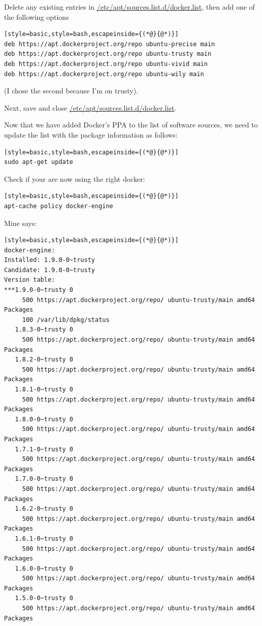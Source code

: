 \documentclass[12pt, a4paper, twoside,openany,titlepage]{article}
\begin{document}
{
Delete any existing entries in \url{/etc/apt/sources.list.d/docker.list}, then add one of the following options
\begin{lstlisting}[style=basic,style=bash,escapeinside={(*@}{@*)}]
deb https://apt.dockerproject.org/repo ubuntu-precise main
deb https://apt.dockerproject.org/repo ubuntu-trusty main
deb https://apt.dockerproject.org/repo ubuntu-vivid main
deb https://apt.dockerproject.org/repo ubuntu-wily main
\end{lstlisting}
(I chose the second because I'm on trusty).

Next, save and close \url{/etc/apt/sources.list.d/docker.list}.

Now that we have added Docker's PPA to the list of software sources, we need to update the list with the package information as follows:
\begin{lstlisting}[style=basic,style=bash,escapeinside={(*@}{@*)}]
sudo apt-get update
\end{lstlisting}

Check if your are now using the right docker:
\begin{lstlisting}[style=basic,style=bash,escapeinside={(*@}{@*)}]
apt-cache policy docker-engine
\end{lstlisting}
Mine says:
\begin{lstlisting}[style=basic,style=bash,escapeinside={(*@}{@*)}]
docker-engine:
Installed: 1.9.0-0~trusty
Candidate: 1.9.0-0~trusty
Version table:
***1.9.0-0~trusty 0
     500 https://apt.dockerproject.org/repo/ ubuntu-trusty/main amd64 Packages
     100 /var/lib/dpkg/status
   1.8.3-0~trusty 0
     500 https://apt.dockerproject.org/repo/ ubuntu-trusty/main amd64 Packages
   1.8.2-0~trusty 0
     500 https://apt.dockerproject.org/repo/ ubuntu-trusty/main amd64 Packages
   1.8.1-0~trusty 0
     500 https://apt.dockerproject.org/repo/ ubuntu-trusty/main amd64 Packages
   1.8.0-0~trusty 0
     500 https://apt.dockerproject.org/repo/ ubuntu-trusty/main amd64 Packages
   1.7.1-0~trusty 0
     500 https://apt.dockerproject.org/repo/ ubuntu-trusty/main amd64 Packages
   1.7.0-0~trusty 0
     500 https://apt.dockerproject.org/repo/ ubuntu-trusty/main amd64 Packages
   1.6.2-0~trusty 0
     500 https://apt.dockerproject.org/repo/ ubuntu-trusty/main amd64 Packages
   1.6.1-0~trusty 0
     500 https://apt.dockerproject.org/repo/ ubuntu-trusty/main amd64 Packages
   1.6.0-0~trusty 0
     500 https://apt.dockerproject.org/repo/ ubuntu-trusty/main amd64 Packages
   1.5.0-0~trusty 0
     500 https://apt.dockerproject.org/repo/ ubuntu-trusty/main amd64 Packages
\end{lstlisting}

}
\end{document}

